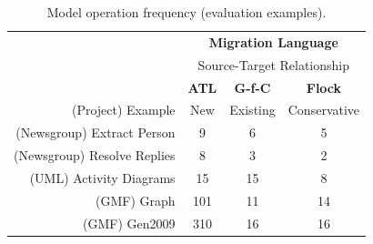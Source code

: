 \begin{table}
	\centering
	\begin{tabular}{|r|c|c|c|}
		\hline
		                              & \multicolumn{3}{|c|}{\textbf{Migration Language}} \\
													  			& \multicolumn{3}{|c|}{Source-Target Relationship} \\
		\hline
		                              & \textbf{ATL} & \textbf{G-f-C} & \textbf{Flock} \\
		(Project) Example             & New & Existing & Conservative \\
		\hline
		\hline
		(Newsgroup) Extract Person    & 9  &  6  &  5  \\
		\hline                       
		(Newsgroup) Resolve Replies   &  8  &  3  &  2  \\
		\hline                       
		(UML) Activity Diagrams       &  15  &  15  &  8  \\
		\hline                       
		(GMF) Graph                   &  101  &  11  &  14  \\
		\hline                       
		(GMF) Gen2009                 &  310  &  16  &  16  \\
		\hline
	\end{tabular}
	\label{tab:model_operations_results}
	\caption{Model operation frequency (evaluation examples).}
\end{table}

